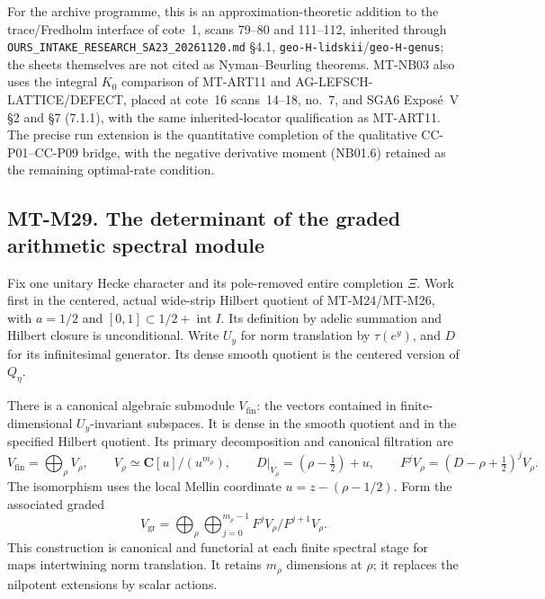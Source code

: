 For the archive programme, this is an approximation-theoretic
addition to the trace/Fredholm interface of cote~1, scans
79--80 and 111--112, inherited through
\texttt{OURS\_INTAKE\_RESEARCH\_SA23\_20261120.md} \S4.1,
\texttt{geo-H-lidskii}/\texttt{geo-H-genus}; the sheets themselves
are not cited as Nyman--Beurling theorems. MT-NB03 also uses
the integral $K_0$ comparison of MT-ART11 and
AG-LEFSCH-LATTICE/DEFECT, placed at cote~16 scans~14--18,
no.~7, and SGA6 Expos\'e~V \S2 and \S7 (7.1.1), with the
same inherited-locator qualification as MT-ART11. The precise
run extension is the quantitative completion of the qualitative
CC-P01--CC-P09 bridge, with the negative derivative moment
(NB01.6) retained as the remaining optimal-rate condition.

\subsection*{MT-M29. The determinant of the graded arithmetic spectral module}
Fix one unitary Hecke character and its pole-removed entire
completion \(\Xi\). Work first in the centered, actual wide-strip
Hilbert quotient of MT-M24/MT-M26, with \(a=1/2\) and
\([0,1]\subset1/2+\operatorname{int}I\). Its definition by adelic
summation and Hilbert closure is unconditional. Write \(U_y\)
for norm translation by \(\tau(e^y)\), and \(D\) for its
infinitesimal generator. Its dense smooth quotient is the
centered version of \(Q_\eta\).

There is a canonical algebraic submodule \(V_{\mathrm{fin}}\):
the vectors contained in finite-dimensional \(U_y\)-invariant
subspaces. It is dense in the smooth quotient and in the
specified Hilbert quotient. Its primary decomposition and
canonical filtration are
\[
 V_{\mathrm{fin}}=\bigoplus_\rho V_\rho,\qquad
 V_\rho\simeq\mathbf C[u]/(u^{m_\rho}),\qquad
 D|_{V_\rho}=(\rho-\tfrac12)+u,\qquad
 F^jV_\rho=(D-\rho+\tfrac12)^jV_\rho .
                                                               \tag{M29.1}
\]
The isomorphism uses the local Mellin coordinate
\(u=z-(\rho-1/2)\). Form the associated graded
\[
       V_{\mathrm{gr}}
          =\bigoplus_\rho\bigoplus_{j=0}^{m_\rho-1}
                         F^jV_\rho/F^{j+1}V_\rho.             \tag{M29.2}
\]
This construction is canonical and functorial at each finite
spectral stage for maps intertwining norm translation. It
retains \(m_\rho\) dimensions at \(\rho\); it replaces the
nilpotent extensions by scalar actions.

